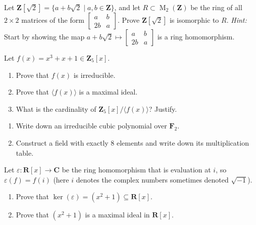 \documentclass[11pt,twoside,openany]{memoir}
\begin{document}
    \begin{exercise}
    Let $\mathbf{Z}[\sqrt{2}]=\{a+b\sqrt{2} \mid a,b\in \mathbf{Z}\}$, and let $R\subset \operatorname{M}_2(\mathbf{Z})$ be the ring of all $2\times 2$ matrices of the form $\begin{bmatrix} a & b \\ 2b & a\end{bmatrix}$. Prove $\mathbf{Z}[\sqrt{2}]$ is isomorphic to $R$. \textit{Hint:} Start by showing the map $a+b\sqrt{2} \mapsto \begin{bmatrix} a & b \\ 2b & a\end{bmatrix}$ is a ring homomorphism.
    \end{exercise}
    
    \begin{exercise}
    Let $f(x)=x^3+x+1\in \mathbf{Z}_5[x]$.
    \begin{enumerate}[label = (\arabic*)]
        \item Prove that $f(x)$ is irreducible.
        \item Prove that $\langle f(x)\rangle$ is a maximal ideal.
        \item What is the cardinality of $\mathbf{Z}_5[x]/\langle f(x)\rangle$? Justify.
    \end{enumerate}
    \end{exercise}
    
    \begin{exercise}
    \phantom{a}
    \begin{enumerate}[label = (\arabic*)]
        \item Write down an irreducible cubic polynomial over $\mathbf{F}_2$.
        \item Construct a field with exactly 8 elements and write down its multiplication table.
    \end{enumerate}
    \end{exercise}
    
    \begin{exercise}
    Let $\varepsilon:\mathbf{R}[x]\to \mathbf{C}$ be the ring homomorphism that is evaluation at $i$, so $\varepsilon(f) = f(i)$ (here $i$ denotes the complex numbers sometimes denoted $\sqrt{-1}$).
    \begin{enumerate}[label = (\arabic*)]
        \item Prove that $\ker(\varepsilon)=(x^2+1)\subseteq \mathbf{R}[x]$.
        \item Prove that $(x^2+1)$ is a maximal ideal in $\mathbf{R}[x]$.
    \end{enumerate}
    \end{exercise}
    
\end{document}
